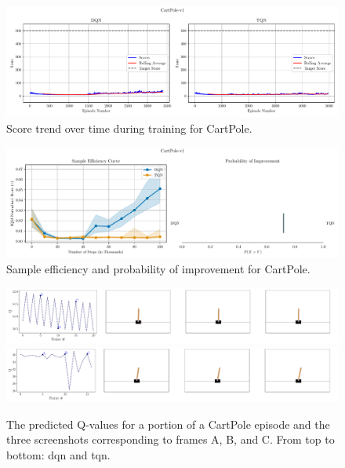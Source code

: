 \begin{figure}[!htbp]
\centering
\includegraphics[width=\textwidth]{images/score-vs-episode_DQN-TQN_CartPole-v1.pdf}
\caption{Score trend over time during training for CartPole.}
\label{fig:score-vs-episode-CartPole-v1}
\end{figure}

\begin{figure}[!htbp]
\centering
\includegraphics[width=\textwidth]{images/sample-efficiency-probability-improvement_DQN-TQN_CartPole-v1.pdf}
\caption{Sample efficiency and probability of improvement for CartPole.}
\label{fig:sample-efficiency-CartPole-v1}
\end{figure}

\begin{figure}[!htbp]
\centering
\includegraphics[width=\textwidth]{images/q-vs-frame_DQN_CartPole-v1.pdf}
\includegraphics[width=\textwidth]{images/q-vs-frame_TQN_CartPole-v1.pdf}
\caption{The predicted Q-values for a portion of a CartPole episode and the three screenshots corresponding to frames A, B, and C. From top to bottom: \acrshort{dqn} and \acrshort{tqn}.}
\label{fig:q-vs-frame-DQN-CartPole-v1}
\end{figure}

